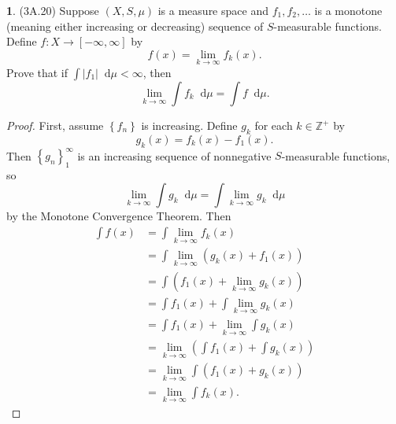 \documentclass[12pt]{article}
\newcommand{\dd}{\mathop{}\!\mathrm{d}}
\theoremstyle{definition}
\newtheorem{ex}{}
\begin{document}
\begin{ex}
	(3A.20)
	Suppose $(X, S, \mu)$ is a measure space and $f_1, f_2, \dots$ is a monotone (meaning either increasing or decreasing) sequence of $S$-measurable functions.
	Define $f: X \to [-\infty, \infty]$ by \begin{equation*}
		f(x) = \lim_{k \to \infty} f_k(x).
	\end{equation*}
	Prove that if $\int |f_1| \dd \mu < \infty$, then \begin{equation*}
		\lim_{k \to \infty} \int f_k \dd \mu = \int f \dd \mu.
	\end{equation*}
\end{ex}
\begin{proof}
	First, assume $\left\lbrace f_n \right\rbrace$ is increasing.
	Define $g_k$ for each $k \in \mathbb{Z}^+$ by \begin{equation*}
		g_k(x) = f_k(x) - f_1(x).
	\end{equation*}
	Then $\left\lbrace g_n \right\rbrace_1^\infty$ is an increasing sequence of nonnegative $S$-measurable functions, so \begin{equation*}
		\lim_{k \to \infty} \int g_k \dd \mu = \int \lim_{k \to \infty} g_k \dd \mu
	\end{equation*}
	by the Monotone Convergence Theorem.
	Then \begin{align*}
		\int f(x) & = \int \lim_{k \to \infty} f_k(x)                              \\
		          & = \int \lim_{k \to \infty} \left(g_k(x) + f_1(x)\right)        \\
		          & = \int \left( f_1(x) + \lim_{k \to \infty} g_k(x) \right)      \\
		          & = \int f_1(x) + \int \lim_{k \to \infty} g_k(x)                \\
		          & = \int f_1(x) + \lim_{k \to \infty} \int g_k(x)                \\
		          & = \lim_{k \to \infty} \left( \int f_1(x) + \int g_k(x) \right) \\
		          & = \lim_{k \to \infty} \int \left( f_1(x) + g_k(x) \right)      \\
		          & = \lim_{k \to \infty} \int f_k(x).
	\end{align*}


\end{proof}
\end{document}

